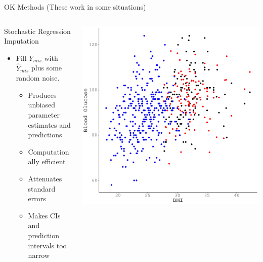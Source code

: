\documentclass{beamer}\usepackage[]{graphicx}\usepackage[]{color}
\makeatletter
\def\maxwidth{ %
  \ifdim\Gin@nat@width>\linewidth
    \linewidth
  \else
    \Gin@nat@width
  \fi
}
\newenvironment{knitrout}{}{} %
\makeatother
\begin{document}

\begin{frame}{OK Methods (These work in some situations)}
  
  \begin{columns}
    \begin{column}{0.5\textwidth}
      
      Stochastic Regression Imputation
      \vc
      \begin{itemize}
      \item Fill $Y_{mis}$ with $\widehat{Y}_{mis}$ plus some random noise.
        \vc
        \begin{itemize}
        \item Produces unbiased parameter estimates and predictions
          \vc
        \item Computationally efficient
          \vc
        \item Attenuates standard errors
          \vc
        \item Makes CIs and prediction intervals too narrow
        \end{itemize}
      \end{itemize}
      
    \end{column}
    \begin{column}{0.5\textwidth}
      
\begin{knitrout}\footnotesize
{}\color{fgcolor}

{\centering \includegraphics[width=\maxwidth]{figure/unnamed-chunk-22-1} 

}
\end{knitrout}
\end{column}
\end{columns}
\end{frame}
\end{document}
